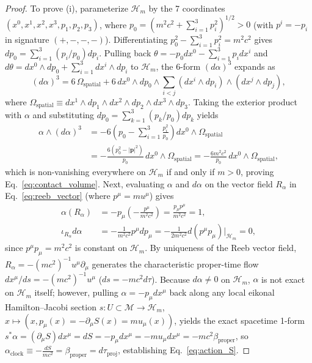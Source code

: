 \documentclass[11pt, a4paper]{article}
\theoremstyle{definition}
\begin{document}
\begin{proof}
To prove (i), parameterize $\mathcal{H}_m$ by the 7 coordinates $(x^0, x^1, x^2, x^3, p_1, p_2, p_3)$, where $p_0 = (m^2 c^2 + \sum_{i=1}^3 p_i^2)^{1/2} > 0$ (with $p^i = -p_i$ in signature $(+,-,-,-)$). Differentiating $p_0^2 - \sum_{i=1}^3 p_i^2 = m^2 c^2$ gives $dp_0 = \sum_{i=1}^3 (p_i / p_0) dp_i$. Pulling back $\theta = -p_0 dx^0 - \sum_{i=1}^3 p_i dx^i$ and $d\theta = dx^0 \wedge dp_0 + \sum_{i=1}^3 dx^i \wedge dp_i$ to $\mathcal{H}_m$, the 6-form $(d\alpha)^3$ expands as
\begin{equation}
(d\alpha)^3 = 6\,\Omega_{\text{spatial}} + 6\,dx^0 \wedge dp_0 \wedge \sum_{i < j} (dx^i \wedge dp_i) \wedge (dx^j \wedge dp_j),
\end{equation}
where $\Omega_{\text{spatial}} \equiv dx^1 \wedge dp_1 \wedge dx^2 \wedge dp_2 \wedge dx^3 \wedge dp_3$. Taking the exterior product with $\alpha$ and substituting $dp_0 = \sum_{k=1}^3 (p_k/p_0)dp_k$ yields
\begin{equation}
\begin{aligned}
\alpha \wedge (d\alpha)^3 &= -6\left( p_0 - \sum_{i=1}^3 \frac{p_i^2}{p_0} \right) dx^0 \wedge \Omega_{\text{spatial}} \\
&= -\frac{6(p_0^2 - |\mathbf{p}|^2)}{p_0}\,dx^0 \wedge \Omega_{\text{spatial}} = -\frac{6 m^2 c^2}{p_0}\,dx^0 \wedge \Omega_{\text{spatial}},
\end{aligned}
\end{equation}
which is non-vanishing everywhere on $\mathcal{H}_m$ if and only if $m > 0$, proving Eq.~\eqref{eq:contact_volume}. Next, evaluating $\alpha$ and $d\alpha$ on the vector field $R_\alpha$ in Eq.~\eqref{eq:reeb_vector} (where $p^\mu = m u^\mu$) gives
\begin{equation}
\begin{aligned}
\alpha(R_\alpha) &= -p_\mu \left(-\frac{p^\mu}{m^2 c^2}\right) = \frac{p_\mu p^\mu}{m^2 c^2} = 1, \\
\iota_{R_\alpha} d\alpha &= -\frac{1}{m^2 c^2} p^\mu dp_\mu = -\frac{1}{2m^2 c^2} d(p^\mu p_\mu)\Big|_{\mathcal{H}_m} = 0,
\end{aligned}
\end{equation}
since $p^\mu p_\mu = m^2 c^2$ is constant on $\mathcal{H}_m$. By uniqueness of the Reeb vector field, $R_\alpha = -(mc^2)^{-1}u^\mu\partial_\mu$ generates the characteristic proper-time flow $dx^\mu/ds = -(mc^2)^{-1}u^\mu$ ($ds = -mc^2 d\tau$). Because $d\alpha \neq 0$ on $\mathcal{H}_m$, $\alpha$ is not exact on $\mathcal{H}_m$ itself; however, pulling $\alpha = -p_\mu dx^\mu$ back along any local eikonal Hamilton--Jacobi section $s: U \subset \mathcal{M} \to \mathcal{H}_m$, $x \mapsto (x, p_\mu(x) = -\partial_\mu S(x) = m u_\mu(x))$, yields the exact spacetime 1-form $s^*\alpha = (\partial_\mu S)dx^\mu = dS = -p_\mu dx^\mu = -m u_\mu dx^\mu = -mc^2 \beta_{\text{proper}}$, so $\alpha_{\text{clock}} \equiv -\frac{dS}{mc^2} = \beta_{\text{proper}} = d\tau_{\text{proj}}$, establishing Eq.~\eqref{eq:action_S}.


\end{proof}
\end{document}
